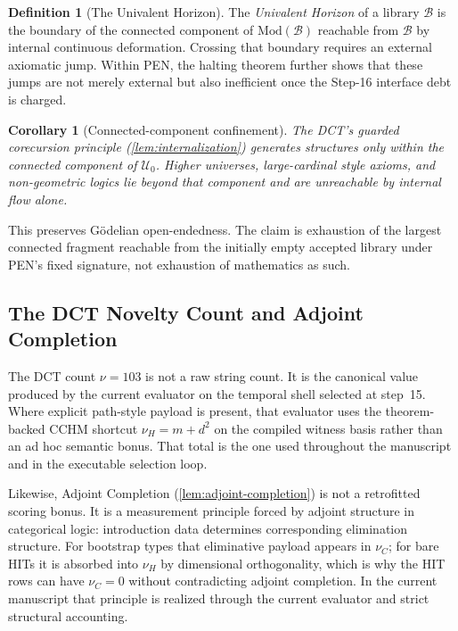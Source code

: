 \documentclass[11pt,a4paper]{article}
\theoremstyle{plain}
\newtheorem{corollary}[theorem]{Corollary}
\theoremstyle{definition}
\newtheorem{definition}[theorem]{Definition}
\theoremstyle{remark}
\newcommand{\U}{\mathcal{U}}
\begin{document}
\begin{definition}[The Univalent Horizon]
\label{def:godelian-horizon}
The \emph{Univalent Horizon} of a library $\mathcal{B}$ is the boundary of the connected component of $\mathrm{Mod}(\mathcal{B})$ reachable from $\mathcal{B}$ by internal continuous deformation.
Crossing that boundary requires an external axiomatic jump.
Within PEN, the halting theorem further shows that these jumps are not merely external but also inefficient once the Step-16 interface debt is charged.
\end{definition}

\begin{corollary}[Connected-component confinement]
\label{cor:confinement}
The DCT's guarded corecursion principle (\cref{lem:internalization}) generates structures only within the connected component of $\U_0$.
Higher universes, large-cardinal style axioms, and non-geometric logics lie beyond that component and are unreachable by internal flow alone.
\end{corollary}

This preserves G\"odelian open-endedness.
The claim is exhaustion of the largest connected fragment reachable from the initially empty accepted library under PEN's fixed signature, not exhaustion of mathematics as such.

\subsection{The DCT Novelty Count and Adjoint Completion}
\label{sec:adjoint-completion}

The DCT count $\nu=103$ is not a raw string count.
It is the canonical value produced by the current evaluator on the temporal shell selected at step~15.
Where explicit path-style payload is present, that evaluator uses the theorem-backed CCHM shortcut $\nu_H=m+d^2$ on the compiled witness basis rather than an ad hoc semantic bonus.
That total is the one used throughout the manuscript and in the executable selection loop.

Likewise, Adjoint Completion (\cref{lem:adjoint-completion}) is not a retrofitted scoring bonus.
It is a measurement principle forced by adjoint structure in categorical logic: introduction data determines corresponding elimination structure.
For bootstrap types that eliminative payload appears in $\nu_C$; for bare HITs it is absorbed into $\nu_H$ by dimensional orthogonality, which is why the HIT rows can have $\nu_C=0$ without contradicting adjoint completion.
In the current manuscript that principle is realized through the current evaluator and strict structural accounting.
\end{document}
